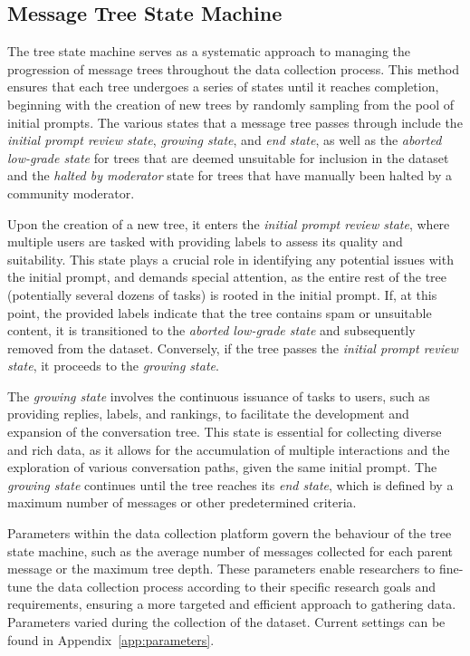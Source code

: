 \subsection{Message Tree State Machine}

The tree state machine serves as a systematic approach to managing the progression of message trees throughout the data collection process. This method ensures that each tree undergoes a series of states until it reaches completion, beginning with the creation of new trees by randomly sampling from the pool of initial prompts. The various states that a message tree passes through include the \emph{initial prompt review state}, \emph{growing state}, and \emph{end state}, as well as the \emph{aborted low-grade state} for trees that are deemed unsuitable for inclusion in the dataset and the \emph{halted by moderator} state for trees that have manually been halted by a community moderator.

Upon the creation of a new tree, it enters the \emph{initial prompt review state}, where multiple users are tasked with providing labels to assess its quality and suitability. This state plays a crucial role in identifying any potential issues with the initial prompt, and demands special attention, as the entire rest of the tree (potentially several dozens of tasks) is rooted in the initial prompt. If, at this point, the provided labels indicate that the tree contains spam or unsuitable content, it is transitioned to the \emph{aborted low-grade state} and subsequently removed from the dataset. Conversely, if the tree passes the \emph{initial prompt review state}, it proceeds to the \emph{growing state}.

The \emph{growing state} involves the continuous issuance of tasks to users, such as providing replies, labels, and rankings, to facilitate the development and expansion of the conversation tree. This state is essential for collecting diverse and rich data, as it allows for the accumulation of multiple interactions and the exploration of various conversation paths, given the same initial prompt. The \emph{growing state} continues until the tree reaches its \emph{end state}, which is defined by a maximum number of messages or other predetermined criteria.

Parameters within the data collection platform govern the behaviour of the tree state machine, such as the average number of messages collected for each parent message or the maximum tree depth. These parameters enable researchers to fine-tune the data collection process according to their specific research goals and requirements, ensuring a more targeted and efficient approach to gathering data. Parameters varied during the collection of the dataset. Current settings can be found in Appendix~\ref{app:parameters}.

